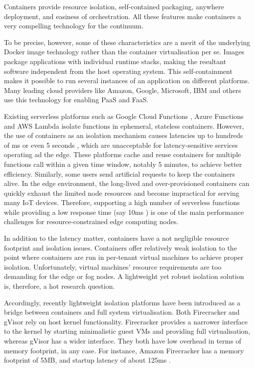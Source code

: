 Containers provide resource isolation, self-contained packaging, anywhere deployment, and easiness of orchestration. All these features make containers a very compelling technology for the continuum.

To be precise, however, some of these characteristics are a merit of the underlying Docker image technology \cite{docker-image} rather than the container virtualisation per se. Images package applications with individual runtime stacks, making the resultant software independent from the host operating system. This self-containment makes it possible to run several instances of an application on different platforms. Many leading cloud providers like Amazon, Google, Microsoft, IBM and others use this technology for enabling PaaS and FaaS.

Existing serverless platforms such as Google Cloud Functions \cite{gcloud-functions}, Azure Functions \cite{azure-functions} and AWS Lambda \cite{aws-lambda} isolate functions in ephemeral, stateless containers. However, the use of containers as an isolation mechanism causes latencies up to hundreds of ms or even 5 seconds \cite{serverless-evaluation}, which are unacceptable for latency-sensitive services operating ad the edge. These platforms cache and reuse containers for multiple functions call within a given time window, notably 5 minutes, to achieve better efficiency. Similarly, some users send artificial requests to keep the containers alive. In the edge environment, the long-lived and over-provisioned containers can quickly exhaust the limited node resources and become impractical for serving many IoT devices. Therefore, supporting a high number of serverless functions while providing a low response time (say 10ms \cite{urllc}) is one of the main performance challenges for resource-constrained edge computing nodes.

In addition to the latency matter, containers have a not negligible resource footprint and isolation issues. Containers offer relatively weak isolation to the point where containers are run in per-tenant virtual machines to achieve proper isolation. Unfortunately, virtual machines' resource requirements are too demanding for the edge or fog nodes. A lightweight yet robust isolation solution is, therefore, a hot research question.

Accordingly, recently lightweight isolation platforms have been introduced as a bridge between containers and full system virtualisation. Both Firecracker and gVisor \cite{gvisor-firecracker} rely on host kernel functionality. Firecracker provides a narrower interface to the kernel by starting minimalistic guest VMs and providing full virtualisation, whereas gVisor has a wider interface. They both have low overhead in terms of memory footprint, in any case. For instance, Amazon Firecracker has a memory footprint of 5MB, and startup latency of about 125ms \cite{firecracker}.

